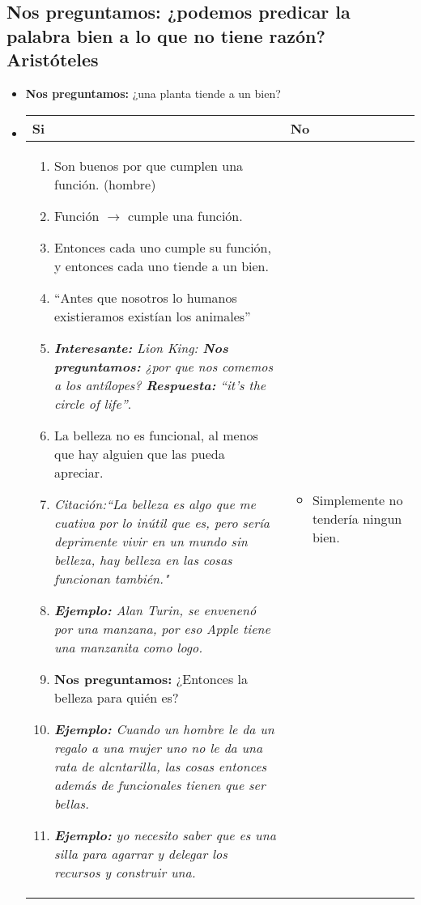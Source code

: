 \subsection{\textbf{Nos preguntamos:} ¿podemos predicar la palabra bien a lo que no tiene razón? Aristóteles}
\begin{itemize}
    \item \textbf{Nos preguntamos:} ¿una planta tiende a un bien?
    \item \begin{center}
       \begin{tabular}{ | p{5cm} | p{5cm} | }
           \hline
               Si & No    \\
           \hline
           \begin{enumerate} %
               \item Son buenos por que cumplen una función. (hombre)
               \item Función $\rightarrow$ cumple una función.
               \item Entonces cada uno cumple su función, y entonces cada uno tiende a un bien.
               \item ``Antes que nosotros lo humanos existieramos existían los animales''
               \item \emph{\textbf{Interesante:} Lion King: \textbf{Nos preguntamos:} ¿por que nos comemos a los antílopes? \emph{\textbf{Respuesta:} ``it's the circle of life''}}.
               \item La belleza no es funcional, al menos que hay alguien que las pueda apreciar.
               \item \emph{Citación:``La belleza es algo que me cuativa por lo inútil que es, pero sería deprimente vivir en un mundo sin belleza, hay belleza en las cosas funcionan también."}
               \item \emph{\textbf{Ejemplo: }Alan Turin, se envenenó por una manzana, por eso Apple tiene una manzanita como logo.}
               \item \textbf{Nos preguntamos:} ¿Entonces la belleza para quién es?
               \item \emph{\textbf{Ejemplo: }Cuando un hombre le da un regalo a una mujer uno no le da una rata de alcntarilla, las cosas entonces además de funcionales tienen que ser bellas. }
               \item \emph{\textbf{Ejemplo: }yo necesito saber que es una silla para agarrar y delegar los recursos y construir una.}
           \end{enumerate} & 
           \begin{itemize} %
               \item Simplemente no tendería ningun bien.
           \end{itemize} \\ 

       \end{tabular}
    \end{center}
\end{itemize}

